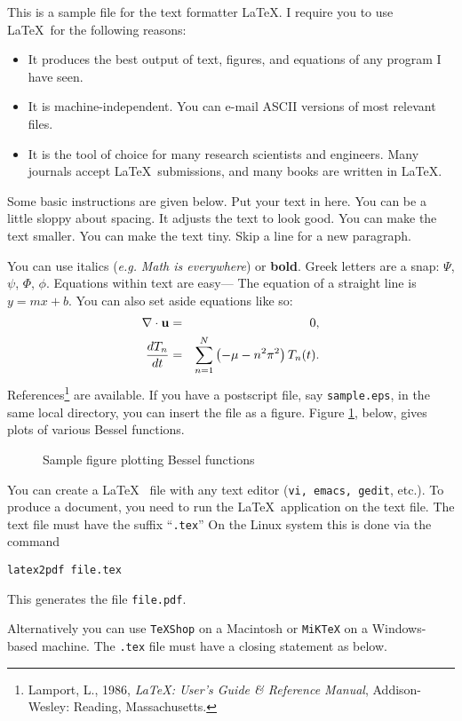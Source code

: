 \documentclass{article}
\begin{document}

\bigskip
This is a sample file for the text formatter \LaTeX.
I require you to use \LaTeX~for the following reasons:

\begin{itemize}

\item
It produces the best output of text, figures,
and equations of any
program I have seen.

\item
It is machine-independent.
You can e-mail ASCII versions of most relevant files.

\item
It is the tool of choice for many research
scientists and engineers.
Many journals accept 
\LaTeX~submissions, and many books
are written in \LaTeX.

\end{itemize}
\medskip
Some basic instructions are given below.
Put your text in here.  You can be a little sloppy    about
spacing.  It adjusts the text to look good.
{\small You can make the text smaller.}
{\tiny You can make the text tiny.}
Skip a line for a new paragraph.   

You can use italics ({\em e.g.} {\em  Math is everywhere}) or {\bf bold}.
Greek letters are a snap: $\Psi$, $\psi$,
$\Phi$, $\phi$.  Equations within text are easy---
The equation of a straight line is $y = m x+b$.
You can also set aside equations like so:
\begin{eqnarray}
\nabla \cdot \bf u &=& 0, \\
{dT_n \over dt} &=& \sum_{n=1}^N \left(-\mu - n^2\pi^2\right)T_n(t).
\end{eqnarray}
References\footnote{Lamport, L., 1986, {\em \LaTeX: User's Guide \& Reference Manual},
    Addison-Wesley: Reading, Massachusetts.}
are available. 
If you have a postscript file, say {\tt sample.eps}, in the same local directory,
you can insert the file as a figure.  Figure \ref{sample}, below, gives plots of various Bessel functions. 
\begin{figure}[h]
\centerline{}
\caption{Sample figure plotting Bessel functions}
\label{sample}
\end{figure}

\medskip
{}
\medskip

You can create a \LaTeX~ file with any text editor ({\tt vi, emacs, gedit},
etc.). 
To produce a document, you need to run the \LaTeX~application
on the text file.  The text file must have the suffix ``{\tt .tex}''
On the Linux system this is done via the command

\medskip
{\tt latex2pdf file.tex}

\medskip
\noindent
This generates the file {\tt file.pdf}.

\bigskip
\noindent
Alternatively you can use {\tt TeXShop} on a Macintosh or {\tt MiKTeX} on a Windows-based machine.
The {\tt .tex} file must have a closing statement as
below.
\end{document}
